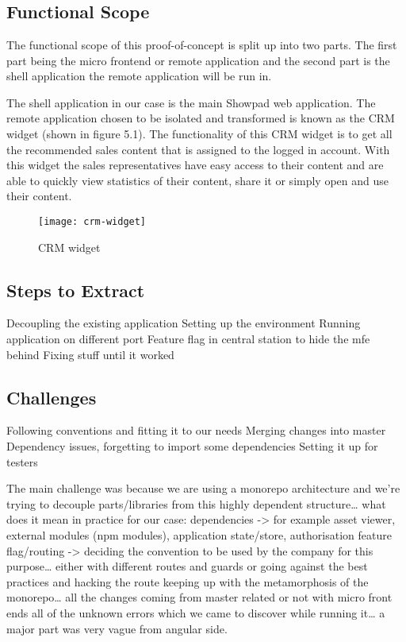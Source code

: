 \chapter{}
\label{ch:scopemicrofrontendapp}
\section{Functional Scope}
The functional scope of this proof-of-concept is split up into two parts. The first part being the micro frontend or remote application and the second part is the shell application the remote application will be run in.

The shell application in our case is the main Showpad web application. The remote application chosen to be isolated and transformed is known as the CRM widget (shown in figure 5.1). The functionality of this CRM widget is to get all the recommended sales content that is assigned to the logged in account. With this widget the sales representatives have easy access to their content and are able to quickly view statistics of their content, share it or simply open and use their content.

\begin{figure}[!h]
    \centering
    \texttt{[image: crm-widget]}
    \caption{CRM widget}
\end{figure}

\section{Steps to Extract}
Decoupling the existing application
Setting up the environment
Running application on different port
Feature flag in central station to hide the mfe behind
Fixing stuff until it worked
\section{Challenges}
Following conventions and fitting it to our needs
Merging changes into master
Dependency issues, forgetting to import some dependencies
Setting it up for testers

The main challenge was because we are using a monorepo architecture and we’re trying to decouple parts/libraries from this highly dependent structure…
what does it mean in practice for our case:
dependencies -> for example asset viewer, external modules (npm modules), application state/store, authorisation
feature flag/routing -> deciding the convention to be used by the company for this purpose… either with different routes and guards or going against the best practices and hacking the route
keeping up with the metamorphosis of the monorepo… all the changes coming from master related or not with micro front ends
all of the unknown errors which we came to discover while running it… a major part was very vague from angular side.
